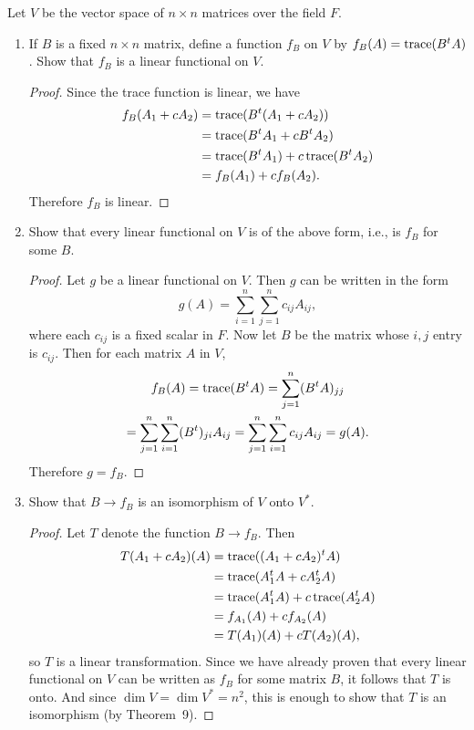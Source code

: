  Let $V$ be the vector space of $n\times n$ matrices over
the field $F$.
\begin{enumerate}
\item If $B$ is a fixed $n\times n$ matrix, define a function $f_B$ on
  $V$ by $f_B(A) = \operatorname{trace}(B^tA)$. Show that $f_B$ is a linear
  functional on $V$.
  \begin{proof}
    Since the trace function is linear, we have
    \begin{align*}
      f_B(A_1 + cA_2)
      &= \operatorname{trace}(B^t(A_1 + cA_2)) \\
      &= \operatorname{trace}(B^tA_1 + cB^tA_2) \\
      &= \operatorname{trace}(B^tA_1) + c\operatorname{trace}(B^tA_2) \\
      &= f_B(A_1) + cf_B(A_2).
    \end{align*}
    Therefore $f_B$ is linear.
  \end{proof}

\item Show that every linear functional on $V$ is of the above form,
  i.e., is $f_B$ for some $B$.
  \begin{proof}
    Let $g$ be a linear functional on $V$. Then $g$ can be written in
    the form
    \begin{equation*}
      g(A) = \sum_{i=1}^n\sum_{j=1}^nc_{ij}A_{ij},
    \end{equation*}
    where each $c_{ij}$ is a fixed scalar in $F$. Now let $B$ be the
    matrix whose $i,j$ entry is $c_{ij}$. Then for each matrix $A$ in
    $V$,
    \begin{multline*}
      f_B(A)
      = \operatorname{trace}(B^tA)
      = \sum_{j=1}^n(B^tA)_{jj} \\
      = \sum_{j=1}^n\sum_{i=1}^n(B^t)_{ji}A_{ij}
      = \sum_{j=1}^n\sum_{i=1}^nc_{ij}A_{ij}
      = g(A).
    \end{multline*}
    Therefore $g = f_B$.
  \end{proof}

\item Show that $B\to f_B$ is an isomorphism of $V$ onto $V^*$.
  \begin{proof}
    Let $T$ denote the function $B\to f_B$. Then
    \begin{align*}
      T(A_1 + cA_2)(A)
      &= \operatorname{trace}((A_1 + cA_2)^tA) \\
      &= \operatorname{trace}(A_1^tA + cA_2^tA) \\
      &= \operatorname{trace}(A_1^tA) + c\operatorname{trace}(A_2^tA) \\
      &= f_{A_1}(A) + cf_{A_2}(A) \\
      &= T(A_1)(A) + cT(A_2)(A),
    \end{align*}
    so $T$ is a linear transformation. Since we have already proven
    that every linear functional on $V$ can be written as $f_B$ for
    some matrix $B$, it follows that $T$ is onto. And since
    $\dim V = \dim V^* = n^2$, this is enough to show that $T$ is an
    isomorphism (by Theorem~9).
  \end{proof}
\end{enumerate}
